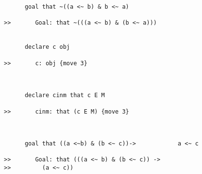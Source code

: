 \documentclass[12pt]{article}
\begin{document}
\begin{verbatim}
      goal that ~((a <~ b) & b <~ a)

>>       Goal: that ~(((a <~ b) & (b <~ a)))


      declare c obj

>>       c: obj {move 3}



      declare cinm that c E M

>>       cinm: that (c E M) {move 3}



      goal that ((a <~b) & (b <~ c))->            a <~ c

>>       Goal: that (((a <~ b) & (b <~ c)) ->
>>         (a <~ c))
\end{verbatim}
\end{document}
